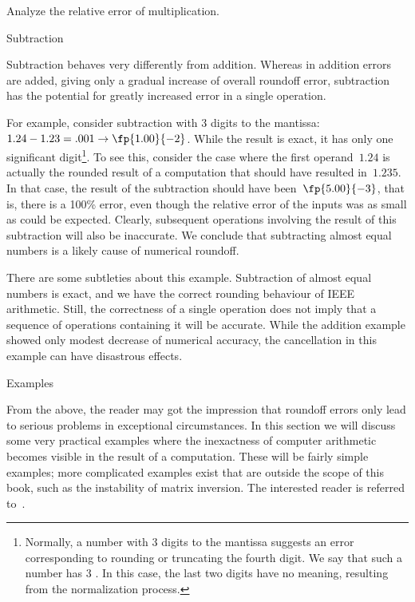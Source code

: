 \begin{exercise}
  Analyze the relative error of multiplication.
\end{exercise}

 {Subtraction}
\label{sec:subtraction}

Subtraction behaves very differently from addition. Whereas in
addition errors are added, giving only a gradual increase of overall
roundoff error, subtraction has the potential for greatly increased
error in a single operation. 

For example, consider subtraction with 3 digits to the mantissa:
$1.24-1.23=.001\rightarrow \fp{1.00}{-2}$. While the result is exact,
it has only one significant digit\footnote {Normally, a number with 3
  digits to the mantissa suggests an error corresponding to rounding
  or truncating the fourth digit. We say that such a number has 3
  . In this case, the last two digits have no
  meaning, resulting from the normalization process.}. To see this, consider
the case where the first operand~$1.24$ is actually the rounded result
of a computation that should have resulted in~$1.235$. In that case,
the result of the subtraction should have been~$\fp{5.00}{-3}$, that
is, there is a 100\% error, even though the relative error of the
inputs was as small as could be expected. Clearly, subsequent
operations involving the result of this subtraction will also be
inaccurate.
We conclude that subtracting almost equal numbers is a likely cause of
numerical roundoff.

There are some subtleties about this example. Subtraction of almost
equal numbers is exact, and we have the correct rounding behaviour of
IEEE arithmetic. Still, the correctness of a single operation does not
imply that a sequence of operations containing it will be
accurate. While the addition example showed only modest decrease of
numerical accuracy, the cancellation in this example can have
disastrous effects.

\begin{comment}
Exercise: sine function through power series. How to deal with the
alternating signs?
\end{comment}

 {Examples}

From the above, the reader may got the impression that roundoff errors
only lead to serious problems in exceptional circumstances. In this
section we will discuss some very practical examples where the
inexactness of computer arithmetic becomes visible in the result of a
computation. These will be fairly simple examples; more complicated
examples exist that are outside the scope of this book, such as the
instability of matrix inversion. The interested reader is referred
to~\cite{Wilkinson:roundoff,Higham:2002:ASN}.

